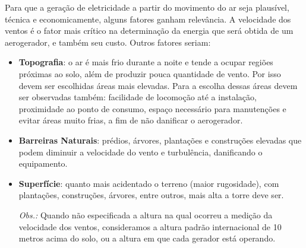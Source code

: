     Para que a geração de eletricidade a partir do movimento do ar seja plausível, técnica e economicamente, alguns fatores
    ganham relevância. A velocidade dos ventos é o fator mais crítico na determinação da energia que será obtida de um
    aerogerador, e também seu custo. Outros fatores seriam:
    \begin{itemize}
     \item \textbf{Topografia}: o ar é mais frio durante a noite e tende a ocupar regiões próximas ao solo, além de produzir
	pouca quantidade de vento. Por isso devem ser escolhidas áreas mais elevadas. Para a escolha dessas áreas devem ser
	observadas também: facilidade de locomoção até a instalação, proximidade ao ponto de consumo, espaço necessário
	para manutenções e evitar áreas muito frias, a fim de não danificar o aerogerador.
	
     \item \textbf{Barreiras Naturais}: prédios, árvores, plantações e construções elevadas que podem diminuir
	a velocidade do vento e turbulência, danificando o equipamento.
      
     \item \textbf{Superfície}: quanto mais acidentado o terreno (maior rugosidade), com plantações, construções, árvores, entre outros,
	mais alta a torre deve ser.
      
     \textit{Obs.:} Quando não especificada a altura na qual ocorreu a medição da velocidade dos ventos,
	consideramos a altura padrão internacional de 10 metros acima do solo, ou a altura em que cada gerador está operando. 
     
    \end{itemize}